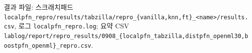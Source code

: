 \par\noindent \textbullet\enspace 결과 파일: 스크래치패드 \texttt{localpfn\allowbreak{}\_\allowbreak{}\allowbreak{}repro/\allowbreak{}\allowbreak{}r\allowbreak{}esults/\allowbreak{}\allowbreak{}t\allowbreak{}abzilla/\allowbreak{}\allowbreak{}repro\_\allowbreak{}\allowbreak{}\{\allowbreak{}v\allowbreak{}anilla,\allowbreak{}k\allowbreak{}nn,\allowbreak{}ft\}\allowbreak{}\_\allowbreak{}\allowbreak{}<\allowbreak{}name>/\allowbreak{}\allowbreak{}re\allowbreak{}sults.\allowbreak{}cs\allowbreak{}v}, 로그 \texttt{localpfn\allowbreak{}\_\allowbreak{}\allowbreak{}repro.\allowbreak{}l\allowbreak{}og}; 요약 CSV \texttt{lablog/\allowbreak{}\allowbreak{}r\allowbreak{}eport/\allowbreak{}\allowbreak{}re\allowbreak{}pro\_\allowbreak{}\allowbreak{}resu\allowbreak{}lts/\allowbreak{}\allowbreak{}0908\allowbreak{}\_\allowbreak{}\allowbreak{}\{\allowbreak{}localp\allowbreak{}fn\_\allowbreak{}\allowbreak{}tabzi\allowbreak{}lla,\allowbreak{}dist\allowbreak{}pfn\_\allowbreak{}\allowbreak{}open\allowbreak{}ml30,\allowbreak{}boo\allowbreak{}stpfn\_\allowbreak{}\allowbreak{}op\allowbreak{}enml\}\allowbreak{}\_\allowbreak{}\allowbreak{}re\allowbreak{}pro.\allowbreak{}csv}.


